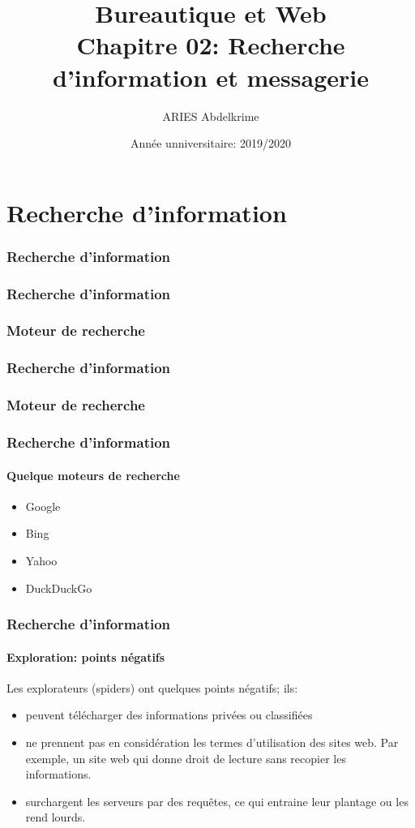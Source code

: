 \documentclass{beamer}
\title[BWEB: 01- RI et Gmail] %
{Bureautique et Web \\Chapitre 02: Recherche d'information et messagerie}
\institute{ %
École  nationale Supérieure d'Informatique (ESI, ex. INI), Algérie
}
\author[ \textbf{\footnotesize  \insertframenumber/\inserttotalframenumber} \hspace*{\fill} ESI (2019-2020)] %
{ARIES Abdelkrime}
\date{Année unniversitaire: 2019/2020} %
\begin{document}
\begin{frame}[plain]
	\maketitle
\end{frame}

\section{Recherche d'information}

\begin{frame}
\frametitle{Recherche d'information}

\end{frame}

\begin{frame}
\frametitle{Recherche d'information}
\frametitle{Moteur de recherche}

\end{frame}

\begin{frame}
\frametitle{Recherche d'information}
\frametitle{Moteur de recherche}

\end{frame}


\begin{frame}
\frametitle{Recherche d'information}
\framesubtitle{Quelque moteurs de recherche}

\begin{itemize}
	\item Google
	\item Bing 
	\item Yahoo
	\item DuckDuckGo
\end{itemize}

\end{frame}


\begin{frame}
\frametitle{Recherche d'information}
\framesubtitle{Exploration: points négatifs}

Les explorateurs (spiders) ont quelques points négatifs; ils:
\begin{itemize}
	\item peuvent télécharger des informations privées ou classifiées
	\item ne prennent pas en considération les termes d'utilisation des sites web. 
	Par exemple, un site web qui donne droit de lecture sans recopier les informations. 
	\item surchargent les serveurs par des requêtes, ce qui entraine leur plantage ou les rend lourds.
\end{itemize}

\end{frame}
\end{document}
